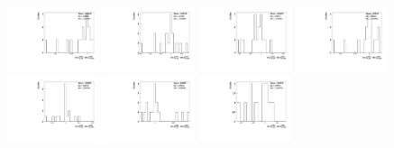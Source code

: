 \begin{figure}[h]\centering
    \includegraphics[width=0.24\textwidth]{figure/polarimetery/syst/model/output_model_4600_delta0.pdf}
    \includegraphics[width=0.24\textwidth]{figure/polarimetery/syst/model/output_model_4612_delta0.pdf}
    \includegraphics[width=0.24\textwidth]{figure/polarimetery/syst/model/output_model_4626_delta0.pdf}
    \includegraphics[width=0.24\textwidth]{figure/polarimetery/syst/model/output_model_4640_delta0.pdf}
    \includegraphics[width=0.24\textwidth]{figure/polarimetery/syst/model/output_model_4660_delta0.pdf}
    \includegraphics[width=0.24\textwidth]{figure/polarimetery/syst/model/output_model_4680_delta0.pdf}
    \includegraphics[width=0.24\textwidth]{figure/polarimetery/syst/model/output_model_4700_delta0.pdf}

\end{figure}
